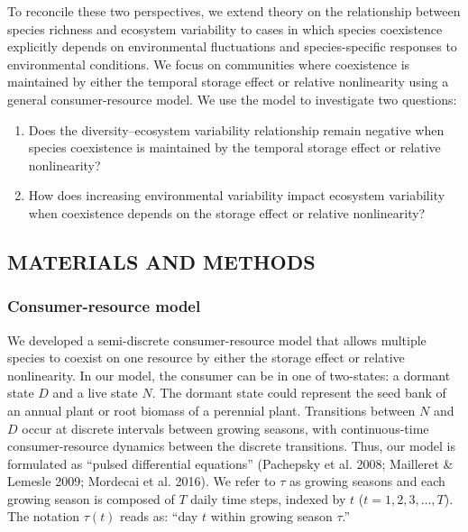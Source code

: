 \documentclass[12pt,]{article}
\begin{document}
To reconcile these two perspectives, we extend theory on the
relationship between species richness and ecosystem variability to cases
in which species coexistence explicitly depends on environmental
fluctuations and species-specific responses to environmental conditions.
We focus on communities where coexistence is maintained by either the
temporal storage effect or relative nonlinearity using a general
consumer-resource model. We use the model to investigate two questions:

\begin{enumerate}
\def\labelenumi{\arabic{enumi}.}
\item
  Does the diversity--ecosystem variability relationship remain negative
  when species coexistence is maintained by the temporal storage effect
  or relative nonlinearity?
\item
  How does increasing environmental variability impact ecosystem
  variability when coexistence depends on the storage effect or relative
  nonlinearity?
\end{enumerate}

\subsection{MATERIALS AND METHODS}\label{materials-and-methods}

\subsubsection{Consumer-resource model}\label{consumer-resource-model}

We developed a semi-discrete consumer-resource model that allows
multiple species to coexist on one resource by either the storage effect
or relative nonlinearity. In our model, the consumer can be in one of
two-states: a dormant state \(D\) and a live state \(N\). The dormant
state could represent the seed bank of an annual plant or root biomass
of a perennial plant. Transitions between \(N\) and \(D\) occur at
discrete intervals between growing seasons, with continuous-time
consumer-resource dynamics between the discrete transitions. Thus, our
model is formulated as ``pulsed differential equations'' (Pachepsky et
al. 2008; Mailleret \& Lemesle 2009; Mordecai et al. 2016). We refer to
\(\tau\) as growing seasons and each growing season is composed of \(T\)
daily time steps, indexed by \(t\) (\(t=1,2,3,\dots,T\)). The notation
\(\tau(t)\) reads as: ``day \(t\) within growing season \(\tau\).''
\end{document}
